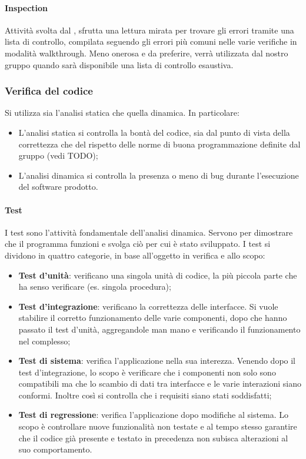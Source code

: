 \paragraph{Inspection}
Attività svolta dal \VE, sfrutta una lettura mirata per trovare gli errori tramite una lista di controllo, compilata seguendo gli errori più comuni nelle varie verifiche in modalità walkthrough. Meno onerosa e da preferire, verrà utilizzata dal nostro gruppo quando sarà disponibile una lista di controllo esaustiva.


\subsubsection{Verifica del codice}
Si utilizza sia l'analisi statica che quella dinamica. In particolare:
\begin{itemize}
\item L'analisi statica si controlla la bontà del codice, sia dal punto di vista della correttezza che del rispetto delle norme di buona programmazione definite dal gruppo (vedi TODO);
\item L'analisi dinamica si controlla la presenza o meno di bug durante l'esecuzione del software prodotto.
\end{itemize}

\paragraph{Test}
I test sono l'attività fondamentale dell'analisi dinamica. Servono per dimostrare che il programma funzioni e svolga ciò per cui è stato sviluppato. I test si dividono in quattro categorie, in base all'oggetto in verifica e allo scopo: 
\begin{itemize}
\item \textbf{Test d'unità}: verificano una singola unità di codice, la più piccola parte che ha senso verificare (es. singola procedura);
\item \textbf{Test d'integrazione}: verificano la correttezza delle interfacce. Si vuole stabilire il corretto funzionamento delle varie componenti, dopo che hanno passato il test d'unità, aggregandole man mano e verificando il funzionamento nel complesso;
\item \textbf{Test di sistema}: verifica l'applicazione nella sua interezza. Venendo dopo il test d'integrazione, lo scopo è verificare che i componenti non solo sono compatibili ma che lo scambio di dati tra interfacce e le varie interazioni siano conformi. Inoltre così si controlla che i requisiti siano stati soddisfatti;
\item \textbf{Test di regressione}: verifica l'applicazione dopo modifiche al sistema. Lo scopo è controllare nuove funzionalità non testate e al tempo stesso garantire che il codice già presente e testato in precedenza non subisca alterazioni al suo comportamento.
\end{itemize}

